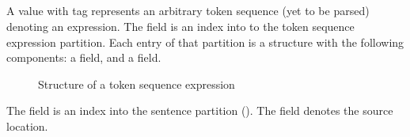 





\subsection{}
\label{sec:ifc:ExprSort:Tokens}

A  value with tag  represents an arbitrary token sequence (yet to be parsed) denoting an expression. 
The  field is an index into to the token sequence expression partition.
Each entry of that partition is a structure with the following components: a  field, and a  field.
%
\begin{figure}[H]
	\centering
	\caption{Structure of a token sequence expression}
	\label{fig:ifc-token-sequence-expression-structure}
\end{figure}
%
The  field is an index into the sentence partition ().
The  field denotes the source location.


